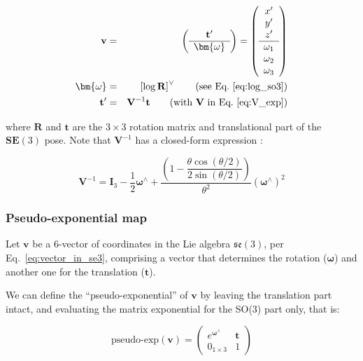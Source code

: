 \documentclass[a4paper,11pt]{report}
\newcommand{\W}{{\bm{\omega}}}
\newcommand{\hatop}[1]{#1^\wedge}
\begin{document}
\begin{eqnarray}
\label{eq:rodrigues_ln_se3}
\mathbf{v} &=&
\left(
\begin{array}{c}
 \mathbf{t}' \\ \hline \W
\end{array}
\right)
=
\left(
\begin{array}{c}
 x'\\y'\\z' \\ \hline \omega_1 \\ \omega_2 \\ \omega_3
\end{array}
\right)
\nonumber \\
\W &=& \left[ \log \mathbf{R} \right]^\vee  \quad \quad \text{(see Eq.~\ref{eq:log_so3})}
\\
\mathbf{t}' &=& \mathbf{V}^{-1} \mathbf{t} \quad \quad \text{(with $\mathbf{V}$ in Eq.~\ref{eq:V_exp})}
\end{eqnarray}

\noindent where $\mathbf{R}$ and $\mathbf{t}$ are the $3 \times 3$ rotation matrix
and translational part of the $\mathbf{SE}(3)$ pose.
Note that $\mathbf{V}^{-1}$ has a closed-form expression \cite{gallier2003computing}:

\begin{equation}
\mathbf{V}^{-1} = \mathbf{I}_3 
- \dfrac{1}{2} \hatop{\W} + 
\dfrac{\left(
 1 - \dfrac{ \theta \cos(\theta/2)}{2 \sin(\theta / 2)}
\right) 
}{\theta^2}  (\hatop{\W})^2
\end{equation}


\subsubsection{Pseudo-exponential map}
\label{sect:se3_pseudo-exp}

Let $\mathbf{v}$ be a 6-vector of coordinates in
the Lie algebra $\mathfrak{se}(3)$, per Eq.~\ref{eq:vector_in_se3}, 
comprising a vector that determines the rotation ($\W$)
and another one for the translation ($\mathbf{t}$).

We can define the ``pseudo-exponential'' of $\mathbf{v}$
by leaving the translation part intact, and evaluating the 
matrix exponential for the SO(3) part only, that is:

\begin{equation}
\label{eq:pseudo-exp-se3}
\text{pseudo-exp}(\mathbf{v}) = 
\left(
\begin{array}{cc}
  e^{\hatop{\W}} & \mathbf{t} \\
   0_{1 \times 3} & 1
\end{array}
\right)
\end{equation}
\end{document}
